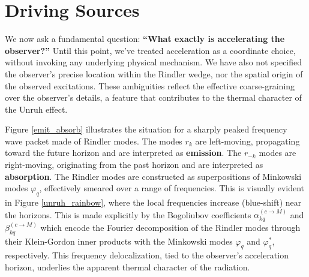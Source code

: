 \documentclass[12pt,a4paper]{article}
\begin{document}
\section{Driving Sources}

We now ask a fundamental question: {\bf ``What exactly is accelerating the observer?''} Until this point, we've treated acceleration as a coordinate choice, without invoking any underlying physical mechanism. We have also not specified the observer’s precise location within the Rindler wedge, nor the spatial origin of the observed excitations. These ambiguities reflect the effective coarse-graining over the observer's details, a feature that contributes to the thermal character of the Unruh effect.

Figure \ref{emit_absorb} illustrates the situation for a sharply peaked frequency wave packet made of Rindler modes. The modes $r_k$ are left-moving, propagating toward the future horizon and are interpreted as {\bf emission}. The $r_{-k}$ modes are right-moving, originating from the past horizon and are interpreted as {\bf absorption}. The Rindler modes are constructed as superpositions of Minkowski modes \(\varphi_q\), effectively smeared over a range of frequencies. This is visually evident in Figure \ref{unruh_rainbow}, where the local frequencies increase (blue-shift) near the horizons. This is made explicitly by the Bogoliubov coefficients \(\alpha_{kq}^{(c \rightarrow M)}\) and \(\beta_{kq}^{(c \rightarrow M)}\) which encode the Fourier decomposition of the Rindler modes through their Klein-Gordon inner products with the Minkowski modes \(\varphi_q\) and \(\varphi_q^*\), respectively. This frequency delocalization, tied to the observer's acceleration horizon, underlies the apparent thermal character of the radiation.
\end{document}
